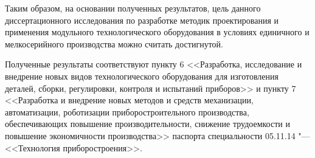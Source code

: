 Таким образом, на основании полученных результатов, цель данного диссертационного исследования по разработке методик проектирования и применения модульного технологического оборудования в условиях единичного и мелкосерийного производства можно считать достигнутой.

Полученные результаты соответствуют пункту 6 <<Разработка, исследование и внедрение новых видов технологического оборудования для изготовления деталей, сборки, регулировки, контроля и испытаний приборов>> и пункту 7 <<Разработка и внедрение новых методов и средств механизации, автоматизации, роботизации приборостроительного производства, обеспечивающих повышение производительности, снижение трудоемкости и повышение экономичности производства>> паспорта специальности 05.11.14 "--- <<Технология приборостроения>>.
